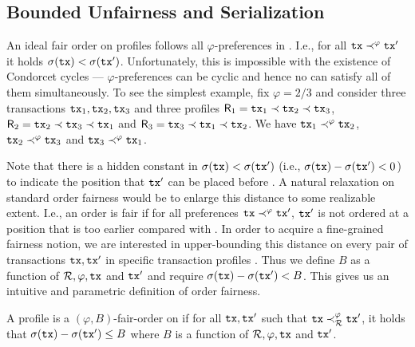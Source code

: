 \subsection{Bounded Unfairness and Serialization}
\label{subsec:bounded-unfairness-serialization}

An ideal fair order \orderOutput on profiles \profileSet follows all $\varphi$-preferences in \profileSet.
%
I.e., for all $\mathtt{tx} \prec^\varphi \mathtt{tx}'$ it holds $\sigma(\mathtt{tx}) < \sigma(\mathtt{tx}')$.
%
Unfortunately, this is impossible with the existence of Condorcet cycles --- $\varphi$-preferences can be cyclic and hence no \orderOutput can satisfy all of them simultaneously.
%
To see the simplest example, fix $\varphi = 2 / 3$ and consider three transactions $\mathtt{tx}_1, \mathtt{tx}_2, \mathtt{tx}_3$ and three profiles $\mathsf{R}_1 = \mathtt{tx}_1 \prec \mathtt{tx}_2 \prec \mathtt{tx}_3$, $\mathsf{R}_2 = \mathtt{tx}_2 \prec \mathtt{tx}_3 \prec \mathtt{tx}_1$ and $\mathsf{R}_3 = \mathtt{tx}_3 \prec \mathtt{tx}_1 \prec \mathtt{tx}_2$.
%
We have $\mathtt{tx}_1 \prec^\varphi \mathtt{tx}_2$,  $\mathtt{tx}_2 \prec^\varphi \mathtt{tx}_3$ and  $\mathtt{tx}_3 \prec^\varphi \mathtt{tx}_1$.

Note that there is a hidden constant in $\sigma(\mathtt{tx}) < \sigma(\mathtt{tx}')$ (i.e., $\sigma(\mathtt{tx}) - \sigma(\mathtt{tx}') < 0$) to indicate the position that $\mathtt{tx}'$ can be placed before \tx.
%
A natural relaxation on standard order fairness would be to enlarge this distance to some realizable extent.
%
I.e., an order is fair if for all preferences $\mathtt{tx} \prec^\varphi \mathtt{tx}'$, $\mathtt{tx}'$ is not ordered at a position that is too earlier compared with \tx.
%
In order to acquire a fine-grained fairness notion, we are interested in upper-bounding this distance on every pair of transactions $\mathtt{tx}, \mathtt{tx}'$ in specific transaction profiles \profileSet.
%
Thus we define $B$ as a function of $\mathcal{R}, \varphi, \mathtt{tx}$ and $\mathtt{tx}'$ and require $\sigma(\mathtt{tx}) - \sigma(\mathtt{tx}') < B$.
%
This gives us an intuitive and parametric definition of order fairness.

\begin{definition}
    \label{def:varphi-b-order-fairness}

    A profile \orderOutput is a $(\varphi, B)$-fair-order on \profileSet if for all $\mathtt{tx}, \mathtt{tx}'$ such that $\mathtt{tx} \prec^\varphi_\mathcal{R} \mathtt{tx}'$, it holds that $\sigma(\mathtt{tx}) - \sigma(\mathtt{tx}') \le B $ where $B$ is a function of $\mathcal{R}, \varphi, \mathtt{tx}$ and $\mathtt{tx}'$.
\end{definition}

